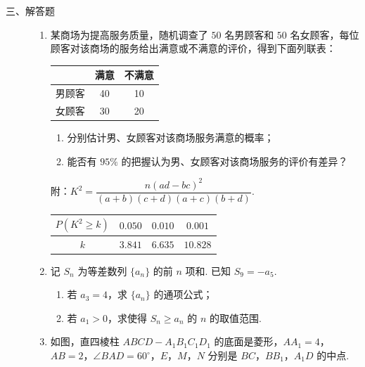 \begin{description}

    \item[三、解答题]

    \begin{enumerate}[leftmargin=5pt]

      \addtocounter{enumi}{+16}

        \item 某商场为提高服务质量，随机调查了 \( 50 \) 名男顾客和 \( 50 \) 名女顾客，每位顾客对该商场的服务给出满意或不满意的评价，得到下面列联表：

\begin{center}
\begin{tabular}{c|cc}
 & 满意 & 不满意 \\ \hline
男顾客 & 40 & 10 \\
女顾客 & 30 & 20
\end{tabular}
\end{center}

\begin{enumerate}
\item 分别估计男、女顾客对该商场服务满意的概率；
\item 能否有 \( 95\% \) 的把握认为男、女顾客对该商场服务的评价有差异？
\end{enumerate}

附：\( K^2=\dfrac{n(ad-bc)^2}{(a+b)(c+d)(a+c)(b+d)} \).

\begin{center}
\begin{tabular}{c|ccc}
\( P(K^2\ge k) \) & \( 0.050 \) & \( 0.010 \) & \( 0.001 \) \\ \hline
\( k \) & \( 3.841 \) & \( 6.635 \) & \( 10.828 \)
\end{tabular}
\end{center}

        \item 记 \( S_n \) 为等差数列 \( \{a_n\} \) 的前 \( n \) 项和. 已知 \( S_9=-a_5 \).

\begin{enumerate}
\item 若 \( a_3=4 \)，求 \( \{a_n\} \) 的通项公式；
\item 若 \( a_1>0 \)，求使得 \( S_n\ge a_n \) 的 \( n \) 的取值范围.
\end{enumerate}

        \item 如图，直四棱柱 \( ABCD-A_1B_1C_1D_1 \) 的底面是菱形，\( AA_1=4 \)，\( AB=2 \)，\( \angle BAD=60^\circ \)，\(E\)，\(M\)，\(N\) 分别是 \(BC\)，\(BB_1\)，\(A_1D\) 的中点.


\end{enumerate}
\end{description}
